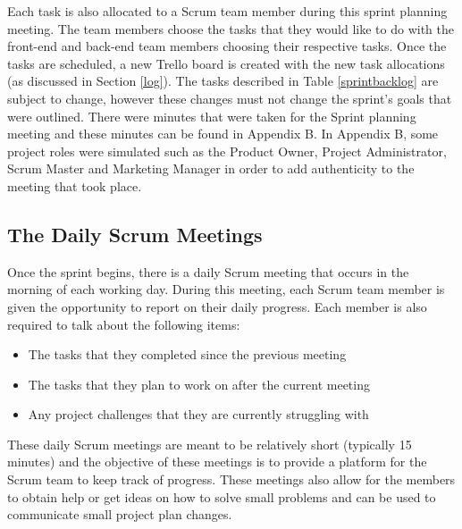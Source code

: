 \documentclass[12pt,onecolumn]{article}
\begin{document}
	Each task is also allocated to a Scrum team member during this sprint planning meeting. The team members choose the tasks that they would like to do with the front-end and back-end team members choosing their respective tasks. Once the tasks are scheduled, a new Trello board is created with the new task allocations (as discussed in Section \ref{log}). The tasks described in Table \ref{sprintbacklog} are subject to change, however these changes must not change the sprint's goals that were outlined. There were minutes that were taken for the Sprint planning meeting and these minutes can be found in Appendix B. In Appendix B, some project roles were simulated such as the Product Owner, Project Administrator, Scrum Master and Marketing Manager in order to add authenticity to the meeting that took place.
	
	\subsection{The Daily Scrum Meetings}
	
	 Once the sprint begins, there is a daily Scrum meeting that occurs in the morning of each working day. During this meeting, each Scrum team member is given the opportunity to report on their daily progress. Each member is also required to talk about the following items:
	
	\begin{itemize}
		\item The tasks that they completed since the previous meeting
		\item The tasks that they plan to work on after the current meeting
		\item Any project challenges that they are currently struggling with 
	\end{itemize}
	
	These daily Scrum meetings are meant to be relatively short (typically 15 minutes) and the objective of these meetings is to provide a platform for the Scrum team to keep track of progress. These meetings also allow for the members to obtain help or get ideas on how to solve small problems and can be used to communicate small project plan changes. 
	
\end{document}
